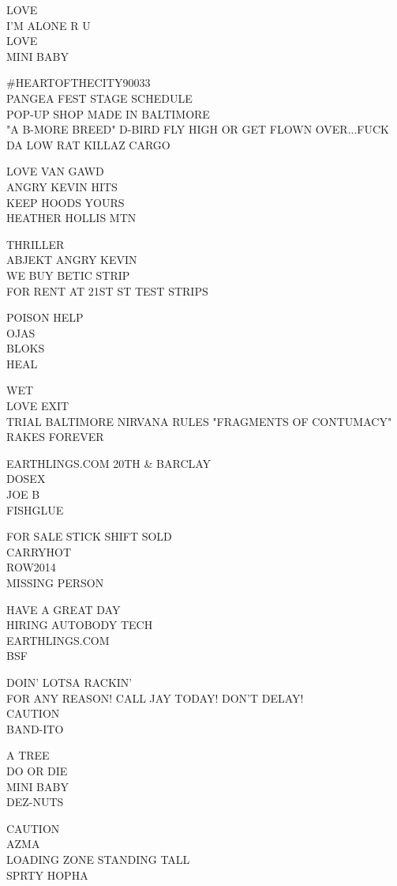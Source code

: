 \documentclass[10pt,letterpaper]{article}
\begin{document}
LOVE\\
I'M ALONE R U\\
LOVE\\
MINI BABY

\#HEARTOFTHECITY90033\\
PANGEA FEST STAGE SCHEDULE\\
POP{-}UP SHOP MADE IN BALTIMORE\\
"A B{-}MORE BREED" D{-}BIRD FLY HIGH OR GET FLOWN OVER...FUCK DA LOW RAT KILLAZ CARGO

LOVE VAN GAWD\\
ANGRY KEVIN HITS\\
KEEP HOODS YOURS\\
HEATHER HOLLIS MTN

THRILLER\\
ABJEKT ANGRY KEVIN\\
WE BUY BETIC STRIP\\
FOR RENT AT 21ST ST TEST STRIPS

POISON HELP\\
OJAS\\
BLOKS\\
HEAL

WET\\
LOVE EXIT\\
TRIAL BALTIMORE NIRVANA RULES "FRAGMENTS OF CONTUMACY"\\
RAKES FOREVER

EARTHLINGS.COM 20TH \& BARCLAY\\
DOSEX\\
JOE B\\
FISHGLUE

FOR SALE STICK SHIFT SOLD\\
CARRYHOT\\
ROW2014\\
MISSING PERSON

HAVE A GREAT DAY\\
HIRING AUTOBODY TECH\\
EARTHLINGS.COM\\
BSF

DOIN' LOTSA RACKIN'\\
FOR ANY REASON!  CALL JAY TODAY!  DON'T DELAY!\\
CAUTION\\
BAND{-}ITO

A TREE\\
DO OR DIE\\
MINI BABY\\
DEZ{-}NUTS

CAUTION\\
AZMA\\
LOADING ZONE STANDING TALL\\
SPRTY HOPHA
\end{document}
